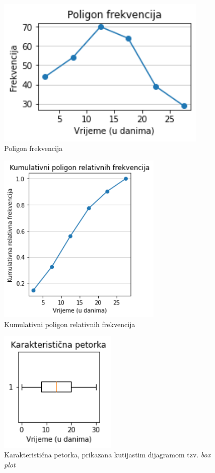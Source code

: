 \begin{figure}[H]
\centering
\includegraphics[width=0.9\textwidth]{assets/poligon_frekvencija.png}
\caption{Poligon frekvencija}
\end{figure}

\begin{figure}[H]
\centering
\includegraphics[width=0.7\textwidth]{assets/kumulativni_poligon_relativnih_frekvencija.png}
\caption{Kumulativni poligon relativnih frekvencija}
\end{figure}

\begin{figure}[H]
\centering
\includegraphics[width=0.5\textwidth]{assets/karakteristicna_petorka.png}
\caption{Karakteristična petorka, prikazana kutijastim dijagramom tzv. \textit{box plot}}
\end{figure}

